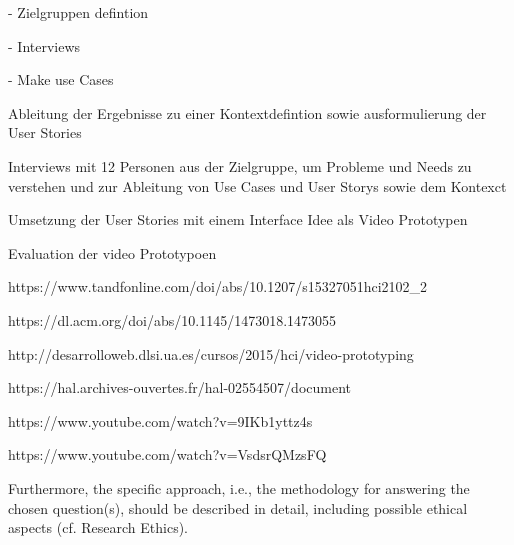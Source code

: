 
- Zielgruppen defintion

- Interviews

- Make use Cases


Ableitung der Ergebnisse zu einer Kontextdefintion sowie ausformulierung der User Stories

Interviews mit 12 Personen aus der Zielgruppe, um Probleme und Needs zu verstehen und zur Ableitung von Use Cases und User Storys sowie dem Kontexct

Umsetzung der User Stories mit einem Interface Idee als Video Prototypen

Evaluation der video Prototypoen

https://www.tandfonline.com/doi/abs/10.1207/s15327051hci2102_2

https://dl.acm.org/doi/abs/10.1145/1473018.1473055

http://desarrolloweb.dlsi.ua.es/cursos/2015/hci/video-prototyping

https://hal.archives-ouvertes.fr/hal-02554507/document

https://www.youtube.com/watch?v=9IKb1yttz4s

https://www.youtube.com/watch?v=VsdsrQMzsFQ


Furthermore, the specific
approach, i.e., the methodology for answering the chosen question(s), should be described in detail, including
possible ethical aspects (cf. Research Ethics).
